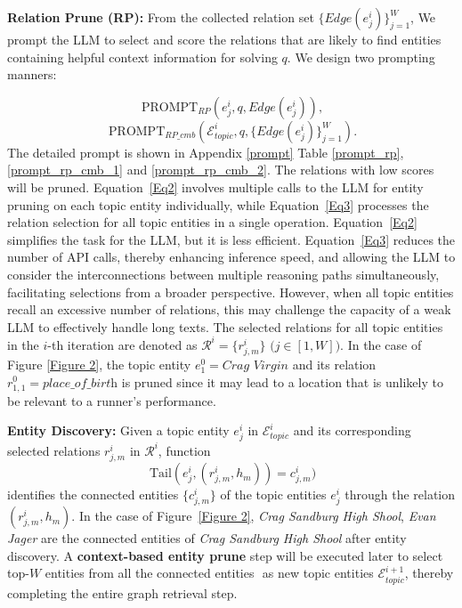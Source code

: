 \documentclass{article} %
\begin{document}
\textbf{Relation Prune (RP):}
From the collected relation set $\{Edge(e_j^{i})\}_{j=1}^W$, We prompt the LLM to select and score the relations that are likely to find entities containing helpful context information for solving $q$. We design two prompting manners:

\begin{equation}~\label{Eq2}
\text{PROMPT}_{RP}(e_j^i, q, Edge(e_j^{i})),
\end{equation}
\begin{equation}~\label{Eq3}
\text{PROMPT}_{RP\_cmb}(\mathcal{E}_{topic}^{i}, q, \{Edge(e_j^{i})\}_{j=1}^W)\text{.}
\end{equation}
The detailed prompt is shown in Appendix \ref{prompt} Table \ref{prompt_rp}, \ref{prompt_rp_cmb_1} and \ref{prompt_rp_cmb_2}. The relations with low scores will be pruned. Equation~\ref{Eq2} involves multiple calls to the LLM for entity pruning on each topic entity individually, while Equation~\ref{Eq3} processes the relation selection for all topic entities in a single operation.
Equation~\ref{Eq2} simplifies the task for the LLM, but it is less efficient. Equation~\ref{Eq3} reduces the number of API calls, thereby enhancing inference speed, and allowing the LLM to consider the interconnections between multiple reasoning paths simultaneously, facilitating selections from a broader perspective. However, when all topic entities recall an excessive number of relations, this may challenge the capacity of a weak LLM to effectively handle long texts. 
The selected relations for all topic entities in the $i$-th iteration are denoted as $\mathcal{R}^{i}= \{r_{j,m}^i\} \text{ (}j \in [1,W]\text{)}$. In the case of Figure \ref{Figure 2}, the topic entity $e_1^0 = \textit{Crag Virgin}$ and its relation $r_{1,1}^0 = \textit{place\_of\_birth}$ is pruned since it may lead to a location that is unlikely to be relevant to a runner's performance.
 
\textbf{Entity Discovery:}
Given a topic entity $e_j^{i}$ in $\mathcal{E}_{topic}^{i}$ and its corresponding selected relations $r_{j,m}^i$ in $\mathcal{R}^i$, function 
\begin{equation}~\label{eq4}
\text{Tail}(e_j^{i}, (r_{j,m}^i, h_m)) = c_{j,m}^i )
\end{equation}
identifies the connected entities $\{c_{j,m}^i\}$ of the topic entities $e_j^i$ through the relation $(r_{j,m}^i, h_m)$. In the case of Figure~\ref{Figure 2}, \textit{Crag Sandburg High Shool}, \textit{Evan Jager} are the connected entities of \textit{Crag Sandburg High Shool} after entity discovery. A \textbf{context-based entity prune} step will be executed later to select top-$W$ entities from all the connected entities ${}$ as new topic entities $\mathcal{E}_{topic}^{i+1}$,  thereby completing the entire graph retrieval step.
\end{document}

